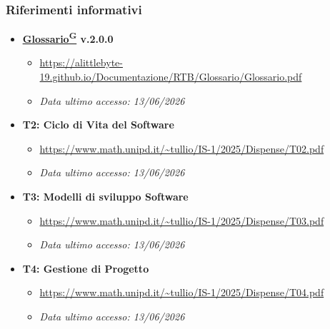 \documentclass[a4paper,12pt]{article}
\providecommand{\glslink}[2]{\href{https://alittlebyte-19.github.io/Documentazione/glossario.html\#gls-#1}{\underline{#2}\textsuperscript{\scriptsize G}}}
\begin{document}
\subsubsection{Riferimenti informativi}
\begin{itemize}
    \item \textbf{\glslink{glossario}{Glossario} v.2.0.0}
    \begin{itemize}
        \item \url{https://alittlebyte-19.github.io/Documentazione/RTB/Glossario/Glossario.pdf}
        \item \textit{Data ultimo accesso: 13/06/2026}
    \end{itemize}
    \item \textbf{T2: Ciclo di Vita del Software}
    \begin{itemize}
        \item \url{https://www.math.unipd.it/~tullio/IS-1/2025/Dispense/T02.pdf}
        \item \textit{Data ultimo accesso: 13/06/2026}
    \end{itemize}
    \item \textbf{T3: Modelli di sviluppo Software}
    \begin{itemize}
        \item \url{https://www.math.unipd.it/~tullio/IS-1/2025/Dispense/T03.pdf}
        \item \textit{Data ultimo accesso: 13/06/2026}
    \end{itemize}
    \item \textbf{T4: Gestione di Progetto}
    \begin{itemize}
        \item \url{https://www.math.unipd.it/~tullio/IS-1/2025/Dispense/T04.pdf}
        \item \textit{Data ultimo accesso: 13/06/2026}
    \end{itemize}
\end{itemize}
\end{document}
